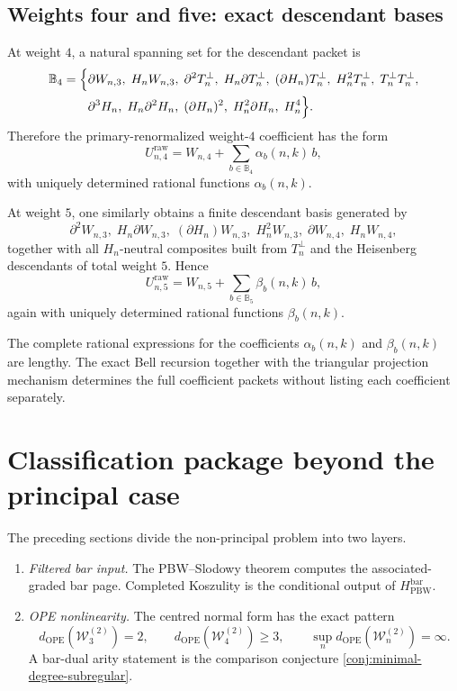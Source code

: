 \subsection{Weights four and five: exact descendant bases}

At weight $4$, a natural spanning set for the descendant packet is
\begin{align*}
\mathbb B_4
=
\Bigl\{
&\partial W_{n,3},\;
H_nW_{n,3},\;
\partial^2T_n^\perp,\;
H_n\partial T_n^\perp,\;
(\partial H_n)T_n^\perp,\;
H_n^2T_n^\perp,\;
T_n^\perp T_n^\perp,
\\
&\partial^3H_n,\;
H_n\partial^2H_n,\;
(\partial H_n)^2,\;
H_n^2\partial H_n,\;
H_n^4
\Bigr\}.
\end{align*}
Therefore the primary-renormalized weight-$4$ coefficient has the form
\[
U_{n,4}^{\mathrm{raw}}=W_{n,4}+\sum_{b\in\mathbb B_4}\alpha_b(n,k)\,b,
\]
with uniquely determined rational functions $\alpha_b(n,k)$.

At weight $5$, one similarly obtains a finite descendant basis generated by
\[
\partial^2W_{n,3},\;
H_n\partial W_{n,3},\;
(\partial H_n)W_{n,3},\;
H_n^2W_{n,3},\;
\partial W_{n,4},\;
H_nW_{n,4},
\]
together with all $H_n$-neutral composites built from $T_n^\perp$ and the
Heisenberg descendants of total weight $5$. Hence
\[
U_{n,5}^{\mathrm{raw}}=W_{n,5}+\sum_{b\in\mathbb B_5}\beta_b(n,k)\,b,
\]
again with uniquely determined rational functions $\beta_b(n,k)$.

\begin{remark}
The complete rational expressions for the coefficients
$\alpha_b(n,k)$ and $\beta_b(n,k)$ are lengthy.  The exact Bell recursion
together with the triangular projection mechanism determines the full
coefficient packets without listing each coefficient separately.
\end{remark}

\section{Classification package beyond the principal case}

The preceding sections divide the non-principal problem into two layers.

\begin{enumerate}[label=(\alph*)]
\item \emph{Filtered bar input.} The PBW--Slodowy theorem computes the
 associated-graded bar page.  Completed Koszulity is the conditional output of
 $H_{\mathrm{PBW}}^{\mathrm{bar}}$.
\item \emph{OPE nonlinearity.} The centred normal form has the exact pattern
 \[
 d_{\mathrm{OPE}}(\mathcal W_3^{(2)})=2,\qquad
 d_{\mathrm{OPE}}(\mathcal W_4^{(2)})\ge3,\qquad
 \sup_n d_{\mathrm{OPE}}(\mathcal W_n^{(2)})=\infty.
 \]
 A bar-dual arity statement is the comparison conjecture
 \ref{conj:minimal-degree-subregular}.
\end{enumerate}

